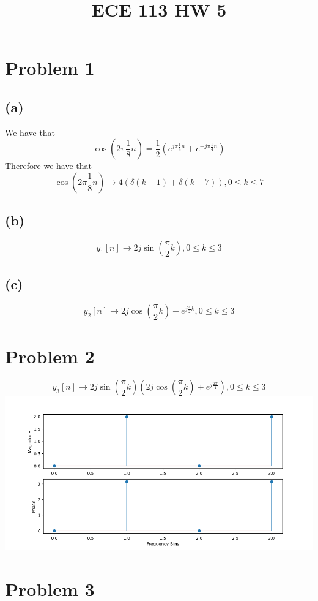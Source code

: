 
\title{ECE 113 HW 5}

\maketitle
\section*{Problem 1}
\subsection*{(a)}
We have that
$$\cos(2\pi\frac{1}{8}n)=\frac{1}{2}\left(e^{j\pi\frac{1}{4}n}+e^{-j\pi\frac{1}{4}n}\right)$$
Therefore we have that
$$\cos(2\pi\frac{1}{8}n)\to\boxed{4\left(\delta(k-1)+\delta(k-7)\right), 0\leq k\leq 7}$$
\subsection*{(b)}
$$y_1[n]\to\boxed{2j\sin(\frac{\pi}{2}k),0\leq k\leq 3}$$
\subsection*{(c)}
$$y_2[n]\to\boxed{2j\cos(\frac{\pi}{2}k)+e^{j\frac{\pi}{2}k},0\leq k\leq 3}$$
\section*{Problem 2}
$$y_3[n]\to\boxed{2j\sin(\frac{\pi}{2}k)\left(2j\cos(\frac{\pi}{2}k)+e^{j\frac{2\pi}{4}}\right),0\leq k\leq 3}$$
\includegraphics*[scale=0.5]{fig.png}
\section*{Problem 3}

